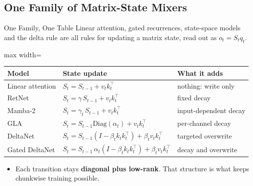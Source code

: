 \subsection{One Family of Matrix-State Mixers}

\begin{frame}{One Family, One Table}
    Linear attention, gated recurrences, state-space models and the delta rule are all rules for updating a matrix state, read out as $o_t=S_tq_t$.
    \vspace{0.3em}
    \begin{center}
    \small
    \renewcommand{\arraystretch}{1.25}
    \begin{adjustbox}{max width=\linewidth}\begin{tabular}{lll}
        \toprule
        \textbf{Model} & \textbf{State update} & \textbf{What it adds} \\
        \midrule
        Linear attention & $S_t=S_{t-1}+v_tk_t^\top$ & nothing: write only \\
        RetNet & $S_t=\gamma\, S_{t-1}+v_tk_t^\top$ & fixed decay \\
        Mamba-2 & $S_t=\gamma_t\, S_{t-1}+v_tk_t^\top$ & input-dependent decay \\
        GLA & $S_t=S_{t-1}\mathrm{Diag}(\alpha_t)+v_tk_t^\top$ & per-channel decay \\
        DeltaNet & $S_t=S_{t-1}(I-\beta_tk_tk_t^\top)+\beta_tv_tk_t^\top$ & targeted overwrite \\
        \rowcolor{KAUSTcyan!12} Gated DeltaNet & $S_t=S_{t-1}\,\alpha_t(I-\beta_tk_tk_t^\top)+\beta_tv_tk_t^\top$ & decay and overwrite \\
        \bottomrule
    \end{tabular}\end{adjustbox}
    \end{center}
    \vspace{0.2em}
    \begin{itemize}
        \item Each transition stays \textbf{diagonal plus low-rank}. That structure is what keeps chunkwise training possible.
    \end{itemize}
\end{frame}

